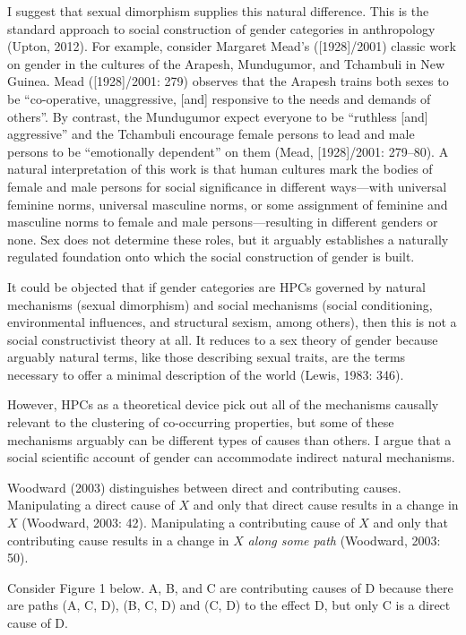 I suggest that sexual dimorphism supplies this natural difference. This
is the standard approach to social construction of gender categories in
anthropology (Upton, 2012). For example, consider Margaret Mead's
({[}1928{]}/2001) classic work on gender in the cultures of the Arapesh,
Mundugumor, and Tchambuli in New Guinea. Mead ({[}1928{]}/2001: 279)
observes that the Arapesh trains both sexes to be ``co-operative,
unaggressive, {[}and{]} responsive to the needs and demands of others''.
By contrast, the Mundugumor expect everyone to be ``ruthless {[}and{]}
aggressive'' and the Tchambuli encourage female persons to lead and male
persons to be ``emotionally dependent'' on them (Mead, {[}1928{]}/2001:
279--80). A natural interpretation of this work is that human cultures
mark the bodies of female and male persons for social significance in
different ways---with universal feminine norms, universal masculine
norms, or some assignment of feminine and masculine norms to female and
male persons---resulting in different genders or none. Sex does not
determine these roles, but it arguably establishes a naturally regulated
foundation onto which the social construction of gender is built.

It could be objected that if gender categories are HPCs governed by
natural mechanisms (sexual dimorphism) and social mechanisms (social
conditioning, environmental influences, and structural sexism, among
others), then this is not a social constructivist theory at all. It
reduces to a sex theory of gender because arguably natural terms, like
those describing sexual traits, are the terms necessary to offer a
minimal description of the world (Lewis, 1983: 346).

However, HPCs as a theoretical device pick out all of the mechanisms
causally relevant to the clustering of co-occurring properties, but some
of these mechanisms arguably can be different types of causes than
others. I argue that a social scientific account of gender can
accommodate indirect natural mechanisms.

Woodward (2003) distinguishes between direct and contributing causes.
Manipulating a direct cause of $X$ and only that direct cause
results in a change in $X$ (Woodward, 2003: 42). Manipulating a
contributing cause of $X$ and only that contributing cause results
in a change in $X$ \emph{along some path} (Woodward, 2003: 50).

\vspace{0.5em}
\noindent Consider Figure 1 below. A, B, and C are contributing causes of D
because there are paths (A, C, D), (B, C, D) and (C, D) to the effect D,
but only C is a direct cause of D.

